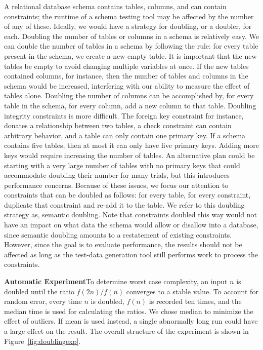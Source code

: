   A relational database schema contains tables, columns, and can contain constraints; the runtime of a schema testing
  tool may be affected by the number of any of these. Ideally, we would have a strategy for doubling, or a doubler, for
  each. Doubling the number of tables or columns in a schema is relatively easy.  We can double the number of tables in
  a schema by following the rule: for every table present in the schema, we create a new empty table. It is important
  that the new tables be empty to avoid changing multiple variables at once.  If the new tables contained columns, for
  instance, then the number of tables and columns in the schema would be increased, interfering with our ability to
  measure the effect of tables alone.  Doubling the number of columns can be accomplished by, for every table in the
  schema, for every column, add a new column to that table.  Doubling integrity constraints is more difficult.  The
  foreign key constraint for instance, donates a relationship between two tables, a check constraint can contain
  arbitrary behavior, and a table can only contain one primary key.  If a schema contains five tables, then at most it
  can only have five primary keys.  Adding more keys would require increasing the number of tables.  An alternative plan
  could be starting with a very large number of tables with no primary keys that could accommodate doubling their number
  for many trials, but this introduces performance concerns.  Because of these issues, we focus our attention to
  constraints that can be doubled as follows: for every table, for every constraint, duplicate that constraint and
  re-add it to the table.  We refer to this doubling strategy as, semantic doubling.  Note that constraints doubled this
  way would not have an impact on what data the schema would allow or disallow into a database, since semantic doubling
  amounts to a restatement of existing constraints.  However, since the goal is to evaluate performance, the results
  should not be affected as long as the test-data generation tool still performs work to process the constraints.


  \textbf{Automatic Experiment}To determine worst case complexity, an input
  $n$ is doubled until the ratio $f(2n) / f(n)$ converges to a stable value.
  To account for random error, every time $n$ is doubled, $f(n)$ is recorded
  ten times, and the median time is used for calculating the ratios.  We chose
  median to minimize the effect of outliers. If mean is used instead, a
  single abnormally long run could have a large effect on the result. The
  overall structure of the experiment is shown in Figure~\ref{fig:doublingexp}.

